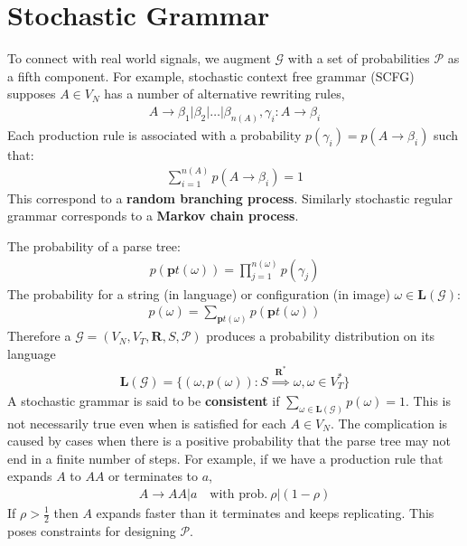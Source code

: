 \documentclass[../Notes_of_CaRiVaC.tex]{subfiles}
\begin{document}
\section{Stochastic Grammar}%
\label{sec:ii.1.4}
To connect with real world signals, we augment $\mathcal{G}$ with a set of
probabilities $\mathcal{P}$ as a fifth component. For example, stochastic
context free grammar (SCFG) supposes $A \in V_N$ has a number of alternative
rewriting rules,
%
\begin{align}
  \label{eq:ii.1.7}
  \tag{1.7}
  A \to \beta_1 \vert \beta_2 \vert \ldots \vert \beta_{n(A)}, \gamma_i: A \to \beta_i
\end{align}
%
Each production rule is associated with a probability
$p(\gamma_i) = p(A \to \beta_i)$ such that:
%
\begin{align}
  \label{eq:ii.1.8}
  \tag{1.8}
  \sum^{n(A)}_{i=1} p(A \to \beta_i) = 1
\end{align}
%
This correspond to a \textbf{random branching process}. Similarly stochastic
regular grammar corresponds to a \textbf{Markov chain process}.

The probability of a parse tree:
%
\begin{align}
  \label{eq:ii.1.9}
  \tag{1.9}
  p(\mathbf{p}t(\omega)) = \prod^{n(\omega)}_{j=1} p(\gamma_j)
\end{align}
%
The probability for a string (in language) or configuration (in image)
$\omega \in \mathbf{L}(\mathcal{G})$:
%
\begin{align}
  \label{eq:ii.1.10}
  \tag{1.10}
  p(\omega) = \sum_{\mathbf{p}t(\omega)} p(\mathbf{p}t(\omega))
\end{align}
%
Therefore a $\mathcal{G} = (V_N, V_T, \mathbf{R}, S, \mathcal{P})$ produces a
probability distribution on its language
%
\begin{align}
  \label{eq:ii.1.11}
  \tag{1.11}
  \mathbf{L}(\mathcal{G}) = \{(\omega, p(\omega)):
    S \overset{\mathbf{R^*}}{\implies} \omega, \omega \in V^*_T\}
\end{align}
%
A stochastic grammar is said to be \textbf{consistent} if
$\sum_{\omega \in \mathbf{L}(\mathcal{G})} p(\omega) = 1$. This is not
necessarily true even when  is satisfied for each $A \in V_N$. The
complication is caused by cases when there is a positive probability that the
parse tree may not end in a finite number of steps. For example, if we have a
production rule that expands $A$ to $AA$ or terminates to $a$,
%
\begin{align*}
  A \to AA \vert a \quad \text{with prob.}~\rho \vert (1 - \rho)
\end{align*}
%
If $\rho > \frac{1}{2}$ then $A$ expands faster than it terminates and keeps
replicating. This poses constraints for designing $\mathcal{P}$.
\end{document}
